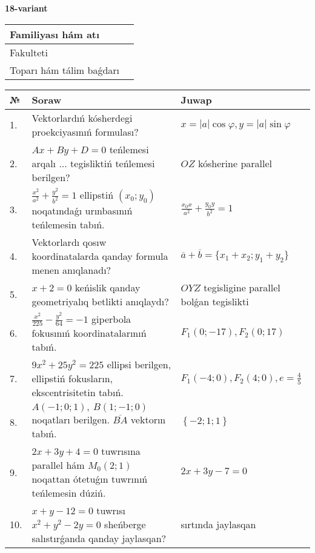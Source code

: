 \documentclass{article}
\begin{document}
\egroup

\newpage


\textbf{18-variant}\\

\bgroup
\def\arraystretch{1.6} %

\begin{tabular}{|m{5.7cm}|m{9.5cm}|}
\hline
Familiyası hám atı & \\
\hline
Fakulteti  & \\
\hline
Toparı hám tálim baǵdarı  & \\
\hline
\end{tabular}

\vspace{1cm}

\begin{tabular}{|m{0.7cm}|m{10cm}|m{4cm}|}
\hline
№ & Soraw & Juwap \\
\hline
1. & Vektorlardıń kósherdegi proekciyasınıń formulası? & $x=|a|\cos\varphi, y=|a|\sin\varphi$ \\
\hline
2. & $Ax+By+D=0$ teńlemesi arqalı ... tegisliktiń teńlemesi berilgen? & $OZ$ kósherine parallel \\
\hline
3. & $\frac{x^2}{a^2}+\frac{y^2}{b^2}=1$ ellipstiń $(x_0;y_0)$ noqatındaǵı urınbasınıń teńlemesin tabıń. & $\frac{x_0x}{a^2}+\frac{y_0y}{b^2}=1$ \\
\hline
4. & Vektorlardı qosıw koordinatalarda qanday formula menen anıqlanadı? & $\overline{a}+\overline{b}=\{x_1+x_2;y_1+y_2\}$ \\
\hline
5. & $x+2=0$ keńislik qanday geometriyalıq betlikti anıqlaydı? &  $OYZ$ tegisligine parallel bolǵan tegislikti \\
\hline
6. & $\frac{x^{2}}{225}-\frac{y^{2}}{64}=-1$ giperbola fokusınıń koordinatalarınıń tabıń. & $F_{1}(0;-17), F_{2}(0;17)$ \\
\hline
7. & $9x^{2}+25y^{2}=225$ ellipsi berilgen, ellipstiń fokusların, ekscentrisitetin tabıń. & $F_1\left(-4;0 \right) , F_2\left( 4;0 \right) , e = \frac{4}{5}$ \\
\hline
8. & $A (-1;0;1),\ B (1;-1;0)$ noqatları berilgen. $\overline{BA}$ vektorın tabıń. & $\left\{ - 2;1;1 \right\}$ \\
\hline
9. & $2x+3y+4=0$ tuwrısına parallel hám $M_{0} (2;1)$ noqattan ótetuǵın tuwrınıń teńlemesin dúziń. & $2x+3y-7=0$ \\
\hline
10. & $x+y-12=0$ tuwrısı $x^{2}+y^{2}-2y=0$ sheńberge salıstırǵanda qanday jaylasqan? & sırtında jaylasqan \\
\hline
\end{tabular}
\end{document}
